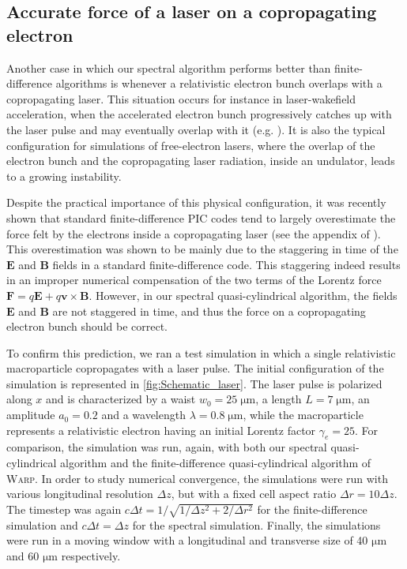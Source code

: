 \documentclass[1p,times]{elsarticle}
\renewcommand{\vec}[1]{\boldsymbol{#1}}
\begin{document}
\subsection{Accurate force of a laser on a copropagating electron}
\label{sec:accurate-laser}

Another case in which our spectral algorithm performs better than
finite-difference algorithms is whenever a relativistic electron bunch
overlaps with a copropagating laser. This situation occurs for
instance in laser-wakefield acceleration, when the accelerated electron bunch
progressively catches up with the laser pulse and may eventually
overlap with it (e.g. \cite{CipicciaNatPhys2011,NemethPRL2008}). It is also the typical
configuration for simulations of free-electron lasers, where the
overlap of the electron bunch and the copropagating laser radiation, inside an
undulator, leads to a growing instability.

Despite the practical importance of this physical configuration, it
was recently shown that standard finite-difference PIC codes tend 
to largely overestimate the force felt by the electrons inside a
copropagating laser (see the appendix of \cite{LehePRSTAB2014}). This
overestimation was shown to be mainly due to the staggering in time 
of the $\vec{E}$ and $\vec{B}$ fields in a standard finite-difference
code. This staggering indeed results in an improper numerical compensation of 
the two terms of the Lorentz force $\vec{F} = q\vec{E} +
q\vec{v}\times\vec{B}$. However, in our spectral quasi-cylindrical
algorithm, the fields $\vec{E}$ and $\vec{B}$ are not staggered in
time, and thus the force on a copropagating electron bunch should be
correct.

To confirm this prediction, we ran a test simulation in which a single
relativistic macroparticle copropagates with a laser pulse. The initial configuration of
the simulation is represented in \cref{fig:Schematic_laser}. The laser
pulse is polarized along $x$ and is characterized by a waist $w_0 = 25\;\mathrm{\mu m}$,
a length $L=7\;\mathrm{\mu m}$, an amplitude $a_0 = 0.2$ and a
wavelength $\lambda = 0.8\;\mathrm{\mu m}$, while the macroparticle
represents a relativistic electron having an initial Lorentz factor
$\gamma_e = 25$. For comparison, the simulation was run, again, with both our spectral
quasi-cylindrical algorithm and the finite-difference
quasi-cylindrical algorithm of \textsc{Warp}. In order to study
numerical convergence, the simulations were run with various
longitudinal resolution $\Delta z$, but with a fixed cell aspect ratio
$\Delta r = 10\Delta z$. The timestep was again $c\Delta t=
1/\sqrt{1/\Delta z^2 + 2/\Delta r^2}$ for the finite-difference
simulation and $c\Delta t = \Delta z$ for the spectral
simulation. Finally, the simulations were run in a moving window with a
longitudinal and transverse size of 40 $\mathrm{\mu m}$ and 60 
$\mathrm{\mu m}$ respectively.
\end{document}
